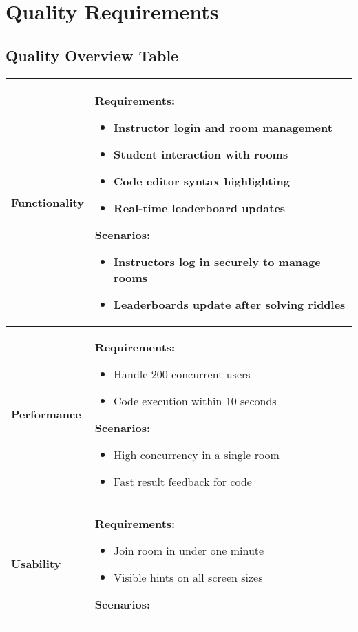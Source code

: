 \section{Quality Requirements}
\label{section-quality-requirements}

\subsection*{Quality Overview Table}

\renewcommand{\arraystretch}{1.3}
\begin{tabularx}{\textwidth}{|p{4.8cm}|X|}
    \hline
    \textbf{Functionality} &
    \textbf{Requirements:}
    \begin{itemize}
        \item Instructor login and room management
        \item Student interaction with rooms
        \item Code editor syntax highlighting
        \item Real-time leaderboard updates
    \end{itemize}
    \textbf{Scenarios:}
    \begin{itemize}
        \item Instructors log in securely to manage rooms
        \item Leaderboards update after solving riddles
    \end{itemize} \\
    \hline
    \textbf{Performance} &
    \textbf{Requirements:}
    \begin{itemize}
        \item Handle 200 concurrent users
        \item Code execution within 10 seconds
    \end{itemize}
    \textbf{Scenarios:}
    \begin{itemize}
        \item High concurrency in a single room
        \item Fast result feedback for code
    \end{itemize} \\
    \hline
    \textbf{Usability} &
    \textbf{Requirements:}
    \begin{itemize}
        \item Join room in under one minute
        \item Visible hints on all screen sizes
    \end{itemize}
    \textbf{Scenarios:}

\end{tabularx}
